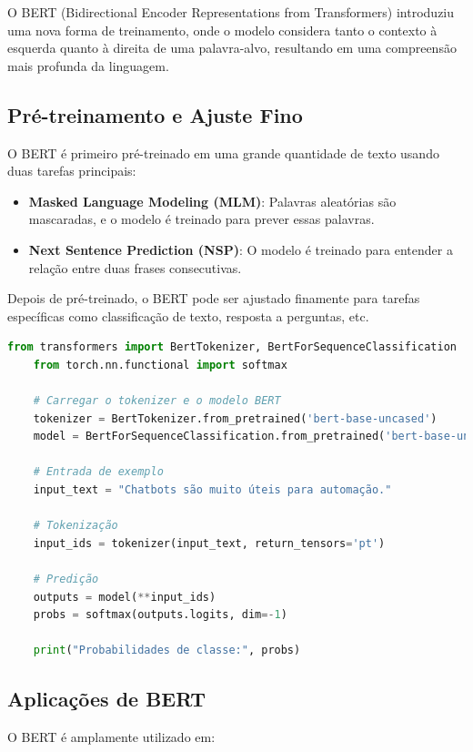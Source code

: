 \documentclass[14pt,a4paper,oneside]{book}
\begin{document}
O BERT (Bidirectional Encoder Representations from Transformers) introduziu uma nova forma de treinamento, onde o modelo considera tanto o contexto à esquerda quanto à direita de uma palavra-alvo, resultando em uma compreensão mais profunda da linguagem.

\subsection{Pré-treinamento e Ajuste Fino}

O BERT é primeiro pré-treinado em uma grande quantidade de texto usando duas tarefas principais:

\begin{itemize}
	\item \textbf{Masked Language Modeling (MLM)}: Palavras aleatórias são mascaradas, e o modelo é treinado para prever essas palavras.
	\item \textbf{Next Sentence Prediction (NSP)}: O modelo é treinado para entender a relação entre duas frases consecutivas.
\end{itemize}

Depois de pré-treinado, o BERT pode ser ajustado finamente para tarefas específicas como classificação de texto, resposta a perguntas, etc.

\begin{lstlisting}[language=Python]
	from transformers import BertTokenizer, BertForSequenceClassification
	from torch.nn.functional import softmax
	
	# Carregar o tokenizer e o modelo BERT
	tokenizer = BertTokenizer.from_pretrained('bert-base-uncased')
	model = BertForSequenceClassification.from_pretrained('bert-base-uncased')
	
	# Entrada de exemplo
	input_text = "Chatbots são muito úteis para automação."
	
	# Tokenização
	input_ids = tokenizer(input_text, return_tensors='pt')
	
	# Predição
	outputs = model(**input_ids)
	probs = softmax(outputs.logits, dim=-1)
	
	print("Probabilidades de classe:", probs)
\end{lstlisting}

\subsection{Aplicações de BERT}

O BERT é amplamente utilizado em:
\end{document}
